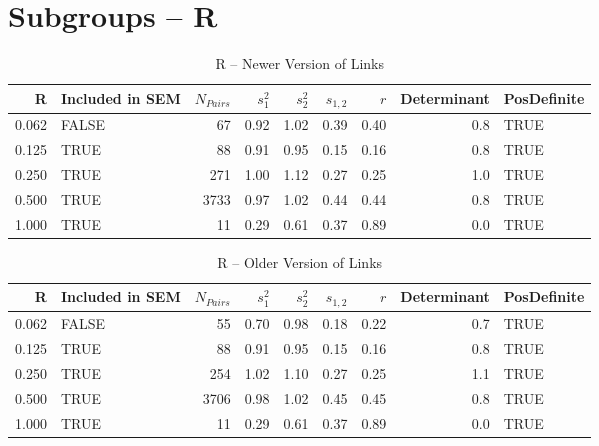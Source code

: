 \documentclass{article}\usepackage{graphicx, color}
\begin{document}
\section{Subgroups --  R }%
\begin{table}[ht]
\centering
\begin{tabular}{rlrrrrrrl}
  \hline
R & Included in SEM & $N_{Pairs}$ & $s_1^2$ & $s_2^2$ & $s_{1,2}$ & $r$ & Determinant & PosDefinite \\ 
  \hline
0.062 & FALSE & 67 & 0.92 & 1.02 & 0.39 & 0.40 & 0.8 & TRUE \\ 
  0.125 & TRUE & 88 & 0.91 & 0.95 & 0.15 & 0.16 & 0.8 & TRUE \\ 
  0.250 & TRUE & 271 & 1.00 & 1.12 & 0.27 & 0.25 & 1.0 & TRUE \\ 
  0.500 & TRUE & 3733 & 0.97 & 1.02 & 0.44 & 0.44 & 0.8 & TRUE \\ 
  1.000 & TRUE & 11 & 0.29 & 0.61 & 0.37 & 0.89 & 0.0 & TRUE \\ 
   \hline
\end{tabular}
\caption{R -- Newer Version of Links} 
\end{table}
\begin{table}[ht]
\centering
\begin{tabular}{rlrrrrrrl}
  \hline
R & Included in SEM & $N_{Pairs}$ & $s_1^2$ & $s_2^2$ & $s_{1,2}$ & $r$ & Determinant & PosDefinite \\ 
  \hline
0.062 & FALSE & 55 & 0.70 & 0.98 & 0.18 & 0.22 & 0.7 & TRUE \\ 
  0.125 & TRUE & 88 & 0.91 & 0.95 & 0.15 & 0.16 & 0.8 & TRUE \\ 
  0.250 & TRUE & 254 & 1.02 & 1.10 & 0.27 & 0.25 & 1.1 & TRUE \\ 
  0.500 & TRUE & 3706 & 0.98 & 1.02 & 0.45 & 0.45 & 0.8 & TRUE \\ 
  1.000 & TRUE & 11 & 0.29 & 0.61 & 0.37 & 0.89 & 0.0 & TRUE \\ 
   \hline
\end{tabular}
\caption{R -- Older Version of Links} 
\end{table}
\newpage 
\end{document}
